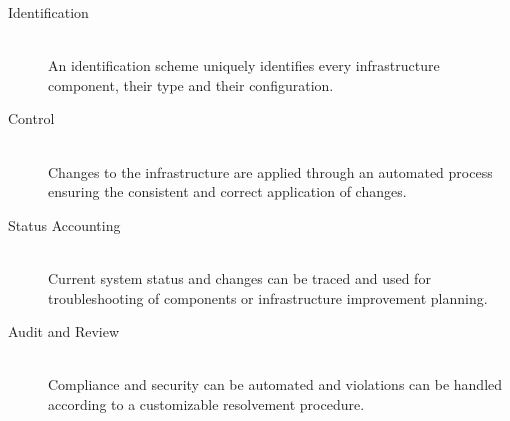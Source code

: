\begin{description}
	
	\item[Identification] \hfill \\ 
	An identification scheme uniquely identifies every infrastructure component, their type and their configuration. 
	
	\item[Control] \hfill \\
	Changes to the infrastructure are applied through an automated process
	ensuring the consistent and correct application of changes.
	
	\item[Status Accounting]  \hfill \\
	Current system status and changes can be traced and used for troubleshooting of components or infrastructure improvement planning.
	
	\item[Audit and Review] \hfill \\
	Compliance and security can be automated and violations can be handled according to a customizable resolvement procedure.  
	
\end{description}
